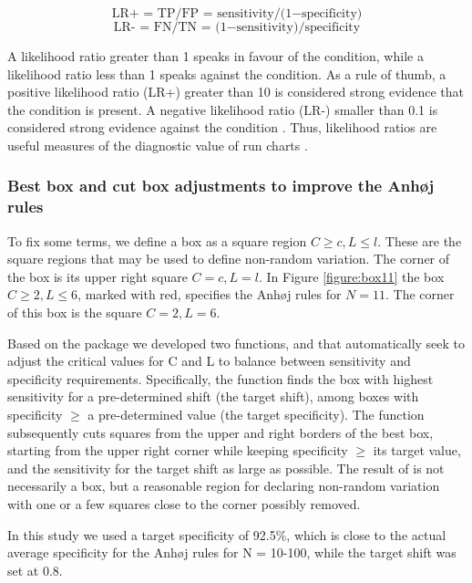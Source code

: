 \[ \text{LR+ = TP/FP = sensitivity/(1} - \text{specificity)} \]
\[ \text{LR- = FN/TN = (1} - \text{sensitivity)/specificity} \]

A likelihood ratio greater than 1 speaks in favour of the condition,
while a likelihood ratio less than 1 speaks against the condition. As a
rule of thumb, a positive likelihood ratio (LR+) greater than 10 is
considered strong evidence that the condition is present. A negative
likelihood ratio (LR-) smaller than 0.1 is considered strong evidence
against the condition \citep{deeks2004}. Thus, likelihood ratios are
useful measures of the diagnostic value of run charts
\citep{anhoej2015, anhoej2018}.

\hypertarget{best-box-and-cut-box-adjustments-to-improve-the-anhj-rules}{%
\subsubsection{Best box and cut box adjustments to improve the Anhøj
rules}\label{best-box-and-cut-box-adjustments-to-improve-the-anhj-rules}}

To fix some terms, we define a box as a square region
\(C \geq c, L \leq l\). These are the square regions that may be used to
define non-random variation. The corner of the box is its upper right
square \(C = c, L = l\). In Figure \ref{figure:box11} the box
\(C \geq 2, L \leq 6\), marked with red, specifies the Anhøj rules for
\(N=11\). The corner of this box is the square \(C = 2, L = 6\).

Based on the  package we developed two functions,
 and  that automatically seek to adjust
the critical values for C and L to balance between sensitivity and
specificity requirements. Specifically, the  function
finds the box with highest sensitivity for a pre-determined shift (the
target shift), among boxes with specificity \(\geq\) a pre-determined
value (the target specificity). The  function
subsequently cuts squares from the upper and right borders of the best
box, starting from the upper right corner while keeping specificity
\(\geq\) its target value, and the sensitivity for the target shift as
large as possible. The result of  is not necessarily a
box, but a reasonable region for declaring non-random variation with one
or a few squares close to the corner possibly removed.

In this study we used a target specificity of 92.5\%, which is close to
the actual average specificity for the Anhøj rules for N = 10-100, while
the target shift was set at 0.8.


